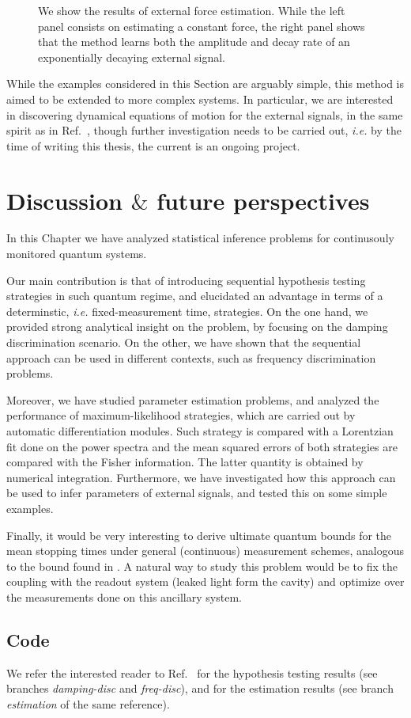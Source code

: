 \begin{figure}[t!]
\begin{subfigure}[b]{0.49\textwidth}
        \caption{}
        \label{fig:forces2}
    \end{subfigure}
    \caption{We show the results of external force estimation. While the left panel consists on estimating a constant force, the right panel shows that the method learns both the amplitude and decay rate of an exponentially decaying external signal.}
    \label{fig:forces_estimation_cmon}
\end{figure}

While the examples considered in this Section are arguably simple, this method is aimed to be extended to more complex systems. In particular, we are interested in discovering dynamical equations of motion for the external signals, in the same spirit as in Ref.~\cite{sindy}, though further investigation needs to be carried out, \textit{i.e.} by the time of writing this thesis, the current is an ongoing project.

\section{Discussion $\&$ future perspectives}
In this Chapter we have analyzed statistical inference problems for continusouly monitored quantum systems.

Our main contribution is that of introducing sequential hypothesis testing strategies in such quantum regime, and elucidated an advantage in terms of a determinstic, \textit{i.e.} fixed-measurement time, strategies. On the one hand, we provided strong analytical insight on the problem, by focusing on the damping discrimination scenario. On the other, we have shown that the sequential approach can be used in different contexts, such as frequency discrimination problems.

Moreover, we have studied parameter estimation problems, and analyzed the performance of maximum-likelihood strategies, which are carried out by automatic differentiation modules. Such strategy is compared with a Lorentzian fit done on the power spectra and the mean squared errors of both strategies are compared with the Fisher information. The latter quantity is obtained by numerical integration. Furthermore, we have investigated how this approach can be used to infer parameters of external signals, and tested this on some simple examples.

Finally, it would be very interesting to derive ultimate quantum bounds for the mean stopping times under general (continuous) measurement schemes, analogous to the bound found in \cite{Vargas2021quantum, Li2022seq}. A natural way to study this problem would be to fix the coupling with the readout system (leaked light form the cavity) and optimize over the measurements done on this ancillary system.


\subsection{Code}
We refer the interested reader to Ref.~\cite{cdisc} for the hypothesis testing results (see branches \textit{damping-disc} and \textit{freq-disc}), and for the estimation results (see branch \textit{estimation} of the same reference).
